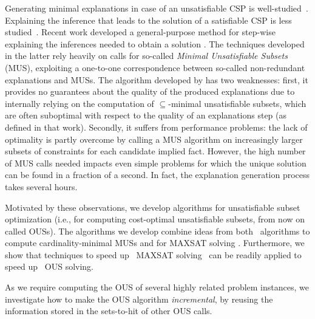 


Generating minimal explanations in case of an unsatisfiable CSP is well-studied~\cite{junker2001quickxplain}. Explaining the inference that leads to the solution of a satisfiable CSP is less studied~\cite{sqalli1996inference,freuder2001explanation}. Recent work developed a general-purpose method for step-wise explaining the inferences needed to obtain a solution \cite{ecai/BogaertsGCG20}. 
The techniques developed in the latter rely heavily on calls for so-called \emph{Minimal Unsatisfiable Subsets} (MUS), exploiting a one-to-one correspondence between so-called non-redundant explanations and MUSs. 
The algorithm developed by \citet{ecai/BogaertsGCG20} has two weaknesses: first, it provides no guarantees about the quality of the produced explanations due to internally relying on the computation of $\subseteq$-minimal unsatisfiable subsets, which are often suboptimal with respect to the quality of an explanations step (as defined in that work). 
Secondly, it suffers from performance problems: the lack of optimality is partly overcome by calling a MUS algorithm on increasingly larger subsets of constraints for each candidate implied fact. %
However, the high number of MUS calls needed impacts even simple problems for which the unique solution can be found in a fraction of a second. 
In fact, the explanation generation process takes several hours.


Motivated by these observations, we develop algorithms for unsatisfiable subset optimization (i.e., for computing cost-optimal unsatisfiable subsets, from now on called OUSs). The algorithms we develop combine ideas from both 
\hitsetbased~algorithms to compute cardinality-minimal MUSs \cite{ignatiev2015smallest} and for MAXSAT solving \cite{DBLP:conf/sat/DaviesB13}.
Furthermore, we show that techniques to speed up \hitsetbased~MAXSAT solving~\cite{davies} can be readily applied to speed up \hitsetbased~OUS solving.

As we require computing the OUS of several highly related problem instances, 
we investigate how to make the OUS algorithm \emph{incremental}, by reusing the information stored in the sets-to-hit of other OUS calls.

